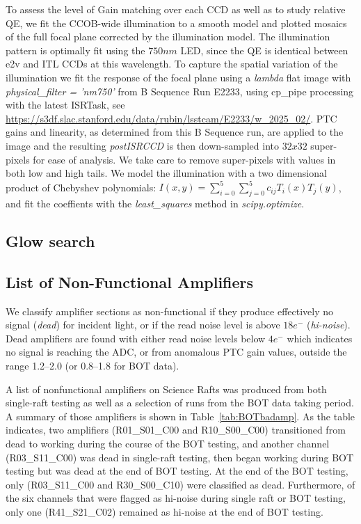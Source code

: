 To assess the level of Gain matching over each CCD as well as to study relative QE, we fit the CCOB-wide illumination to a smooth model and plotted mosaics of the full focal plane corrected by the illumination model. The illumination pattern is optimally fit using the $750 nm$ LED, since the QE is identical between e2v and ITL CCDs at this wavelength. To capture the spatial variation of the illumination we fit the response of the focal plane using a {\it lambda} flat image with {\it physical\_filter = 'nm750'} from B Sequence Run E2233, using cp\_pipe processing with the latest ISRTask, see  \url{https://s3df.slac.stanford.edu/data/rubin/lsstcam/E2233/w_2025_02/}. PTC gains and linearity, as determined from this B Sequence run, are applied to the image and the resulting {\it postISRCCD} is then down-sampled into $32x32$ super-pixels for ease of analysis. We take care to remove super-pixels with values in both low and high tails.  We model the illumination with a two dimensional product of Chebyshev polynomials: $ I(x,y) = \sum_{i=0}^{5} \sum_{j=0}^{5} c_{ij} T_i(x) T_j(y)$, and fit the coeffients with the {\it least\_squares} method in {\it scipy.optimize}. 


\subsection{Glow search}
\subsection{List of Non-Functional Amplifiers}\label{deadamplifiers}

We classify amplifier sections as non-functional if they produce effectively no signal ({\it dead}) for incident light, or if the read noise level is above $18e^{-}$ ({\it hi-noise}).  Dead amplifiers are found with either read noise levels below $4e^{-}$ which indicates no signal is reaching the ADC, or from anomalous PTC gain values, outside the range 1.2--2.0 (or 0.8--1.8 for BOT data). 

A list of nonfunctional amplifiers on Science Rafts was produced from both single-raft testing as well as a selection of runs from the BOT data taking period. A summary of those amplifiers is shown in Table~\ref{tab:BOTbadamp}. As the table indicates, two amplifiers (R01\_S01\_C00 and R10\_S00\_C00) transitioned from dead to working during the course of the BOT testing, and another channel (R03\_S11\_C00) was dead in single-raft testing, then began working during BOT testing but was dead at the end of BOT testing. At the end of the BOT testing, only (R03\_S11\_C00 and R30\_S00\_C10) were classified as dead. Furthermore, of the six channels that were flagged as hi-noise during single raft or BOT testing, only one (R41\_S21\_C02) remained as hi-noise at the end of BOT testing.

